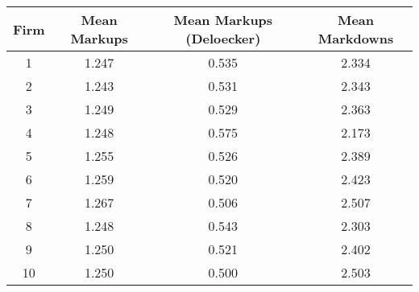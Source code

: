 \begin{tabular}{c|ccc}
Firm & Mean Markups & Mean Markups (Deloecker) & Mean Markdowns \\
\hline
1 & 1.247 & 0.535 & 2.334 \\
2 & 1.243 & 0.531 & 2.343 \\
3 & 1.249 & 0.529 & 2.363 \\
4 & 1.248 & 0.575 & 2.173 \\
5 & 1.255 & 0.526 & 2.389 \\
6 & 1.259 & 0.520 & 2.423 \\
7 & 1.267 & 0.506 & 2.507 \\
8 & 1.248 & 0.543 & 2.303 \\
9 & 1.250 & 0.521 & 2.402 \\
10 & 1.250 & 0.500 & 2.503 \\
\end{tabular}